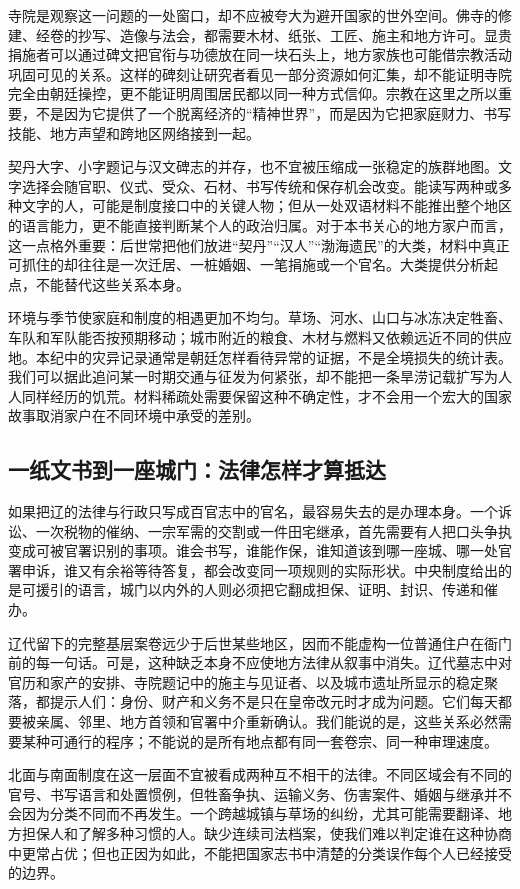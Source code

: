 寺院是观察这一问题的一处窗口，却不应被夸大为避开国家的世外空间。佛寺的修建、经卷的抄写、造像与法会，都需要木材、纸张、工匠、施主和地方许可。显贵捐施者可以通过碑文把官衔与功德放在同一块石头上，地方家族也可能借宗教活动巩固可见的关系。这样的碑刻让研究者看见一部分资源如何汇集，却不能证明寺院完全由朝廷操控，更不能证明周围居民都以同一种方式信仰。宗教在这里之所以重要，不是因为它提供了一个脱离经济的“精神世界”，而是因为它把家庭财力、书写技能、地方声望和跨地区网络接到一起。

契丹大字、小字题记与汉文碑志的并存，也不宜被压缩成一张稳定的族群地图。文字选择会随官职、仪式、受众、石材、书写传统和保存机会改变。能读写两种或多种文字的人，可能是制度接口中的关键人物；但从一处双语材料不能推出整个地区的语言能力，更不能直接判断某个人的政治归属。对于本书关心的地方家户而言，这一点格外重要：后世常把他们放进“契丹”“汉人”“渤海遗民”的大类，材料中真正可抓住的却往往是一次迁居、一桩婚姻、一笔捐施或一个官名。大类提供分析起点，不能替代这些关系本身。

环境与季节使家庭和制度的相遇更加不均匀。草场、河水、山口与冰冻决定牲畜、车队和军队能否按预期移动；城市附近的粮食、木材与燃料又依赖远近不同的供应地。本纪中的灾异记录通常是朝廷怎样看待异常的证据，不是全境损失的统计表。我们可以据此追问某一时期交通与征发为何紧张，却不能把一条旱涝记载扩写为人人同样经历的饥荒。材料稀疏处需要保留这种不确定性，才不会用一个宏大的国家故事取消家户在不同环境中承受的差别。

\subsection{一纸文书到一座城门：法律怎样才算抵达}

如果把辽的法律与行政只写成百官志中的官名，最容易失去的是办理本身。一个诉讼、一次税物的催纳、一宗军需的交割或一件田宅继承，首先需要有人把口头争执变成可被官署识别的事项。谁会书写，谁能作保，谁知道该到哪一座城、哪一处官署申诉，谁又有余裕等待答复，都会改变同一项规则的实际形状。中央制度给出的是可援引的语言，城门以内外的人则必须把它翻成担保、证明、封识、传递和催办。

辽代留下的完整基层案卷远少于后世某些地区，因而不能虚构一位普通住户在衙门前的每一句话。可是，这种缺乏本身不应使地方法律从叙事中消失。辽代墓志中对官历和家产的安排、寺院题记中的施主与见证者、以及城市遗址所显示的稳定聚落，都提示人们：身份、财产和义务不是只在皇帝改元时才成为问题。它们每天都要被亲属、邻里、地方首领和官署中介重新确认。我们能说的是，这些关系必然需要某种可通行的程序；不能说的是所有地点都有同一套卷宗、同一种审理速度。

北面与南面制度在这一层面不宜被看成两种互不相干的法律。不同区域会有不同的官号、书写语言和处置惯例，但牲畜争执、运输义务、伤害案件、婚姻与继承并不会因为分类不同而不再发生。一个跨越城镇与草场的纠纷，尤其可能需要翻译、地方担保人和了解多种习惯的人。缺少连续司法档案，使我们难以判定谁在这种协商中更常占优；但也正因为如此，不能把国家志书中清楚的分类误作每个人已经接受的边界。

